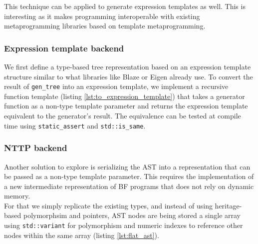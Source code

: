 \documentclass[../../main.tex]{subfiles}
\begin{document}
This technique can be applied to generate expression templates as well.
This is interesting as it makes \constexpr programming interoperable with
existing metaprogramming libraries based on template metaprogramming.



\subsubsection{Expression template backend}

We first define a type-based tree representation based on an expression template
structure similar to what libraries like Blaze\cite{blazelib} or
Eigen\cite{eigen} already use. To convert the result of \lstinline|gen_tree|
into an expression template, we implement a recursive
function template (listing \ref{lst:to_expression_template}) that takes a
generator function as a non-type template parameter and returns the expression
template equivalent to the generator's result. The equivalence can be tested
at compile time using \lstinline|static_assert| and \lstinline|std::is_same|.

\subsubsection{NTTP backend}

Another solution to explore is serializing the AST into a representation that
can be passed as a non-type template parameter. This requires the
implementation of a new intermediate representation of BF programs that does
not rely on dynamic memory.\\

For that we simply replicate the existing types, and instead of using
heritage-based polymorphsim and pointers, AST nodes are being stored a single
array using \lstinline|std::variant| for polymorphism and numeric indexes to
reference other nodes within the same array (listing \ref{lst:flat_ast}).




\end{document}
